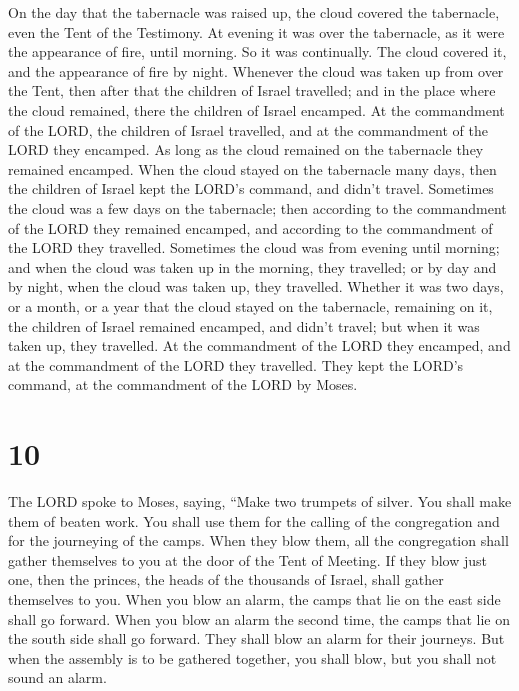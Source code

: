  On the day that the tabernacle was raised up, the cloud
covered the tabernacle, even the Tent of the Testimony. At evening it
was over the tabernacle, as it were the appearance of fire, until
morning.  So it was continually. The cloud covered it,
and the appearance of fire by night.  Whenever the cloud
was taken up from over the Tent, then after that the children of Israel
travelled; and in the place where the cloud remained, there the children
of Israel encamped.  At the commandment of the LORD, the
children of Israel travelled, and at the commandment of the LORD they
encamped. As long as the cloud remained on the tabernacle they remained
encamped.  When the cloud stayed on the tabernacle many
days, then the children of Israel kept the LORD's command, and didn't
travel.  Sometimes the cloud was a few days on the
tabernacle; then according to the commandment of the LORD they remained
encamped, and according to the commandment of the LORD they travelled.
 Sometimes the cloud was from evening until morning; and
when the cloud was taken up in the morning, they travelled; or by day
and by night, when the cloud was taken up, they travelled.
 Whether it was two days, or a month, or a year that the
cloud stayed on the tabernacle, remaining on it, the children of Israel
remained encamped, and didn't travel; but when it was taken up, they
travelled.  At the commandment of the LORD they encamped,
and at the commandment of the LORD they travelled. They kept the LORD's
command, at the commandment of the LORD by Moses.

\hypertarget{section-9}{%
\section{10}\label{section-9}}

 The LORD spoke to Moses, saying,  ``Make
two trumpets of silver. You shall make them of beaten work. You shall
use them for the calling of the congregation and for the journeying of
the camps.  When they blow them, all the congregation
shall gather themselves to you at the door of the Tent of Meeting.
 If they blow just one, then the princes, the heads of the
thousands of Israel, shall gather themselves to you.  When
you blow an alarm, the camps that lie on the east side shall go forward.
 When you blow an alarm the second time, the camps that
lie on the south side shall go forward. They shall blow an alarm for
their journeys.  But when the assembly is to be gathered
together, you shall blow, but you shall not sound an alarm.

